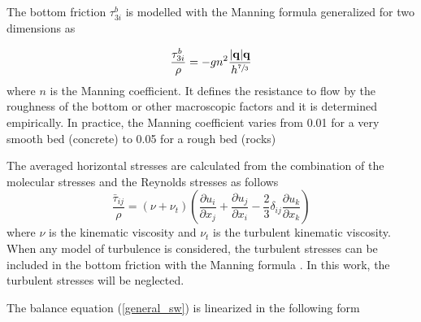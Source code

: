 \documentclass[a4paper,12pt]{elsarticle}
\newcommand{\pder}[2]{\frac{\partial#1}{\partial#2}}
\newcommand{\abs}[1]{\lvert#1\rvert}
\begin{document}
The bottom friction $\tau^b_{3i}$ is modelled with the Manning formula generalized for two dimensions as

\begin{equation}
\frac{\tau^b_{3i}}{\rho} = -gn^2\frac{\abs{\mathbf{q}}\mathbf{q}}{h^{\sfrac{7}{3}}}
\end{equation}
where $n$ is the Manning coefficient. It defines the resistance to flow by the roughness of the bottom or other macroscopic factors and it is determined empirically. In practice, the Manning coefficient varies from 0.01 for a very smooth bed (concrete) to 0.05 for a rough bed (rocks) \cite{chow1988}


The averaged horizontal stresses are calculated from the combination of the molecular stresses and the Reynolds stresses as follows
\begin{equation} \label{stresses}
\frac{\bar{\tau}_{ij}}{\rho} = (\nu + \nu_t)\left(
    \pder{u_i}{x_j} + \pder{u_j}{x_i} -\frac{2}{3}\delta_{ij}\pder{u_k}{x_k} \right)
\end{equation}
where $\nu$ is the kinematic viscosity and $\nu_t$ is the turbulent kinematic viscosity. When any model of turbulence is considered, the turbulent stresses can be included in the bottom friction with the Manning formula \cite{blade2005}. In this work, the turbulent stresses will be neglected.

The balance equation (\ref{general_sw}) is linearized in the following form
\end{document}
